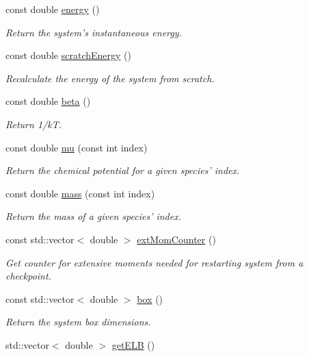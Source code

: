\begin{DoxyCompactItemize}
const double \hyperlink{classsim_system_a37b3d15faf56bf31349f5c2aaf02f858}{energy} ()
\begin{DoxyCompactList}\small\item\em Return the system's instantaneous energy. \end{DoxyCompactList}\item 
const double \hyperlink{classsim_system_a51539ed4c3bb4905b32ce428c1c537fe}{scratch\-Energy} ()
\begin{DoxyCompactList}\small\item\em Recalculate the energy of the system from scratch. \end{DoxyCompactList}\item 
const double \hyperlink{classsim_system_a3eeec9678902f8d7fce4dad6064aaf4c}{beta} ()
\begin{DoxyCompactList}\small\item\em Return 1/k\-T. \end{DoxyCompactList}\item 
const double \hyperlink{classsim_system_af1e3f5320aff976a448647244d5950d1}{mu} (const int index)
\begin{DoxyCompactList}\small\item\em Return the chemical potential for a given species' index. \end{DoxyCompactList}\item 
const double \hyperlink{classsim_system_a7c75052458072e1267bc20594b58d8cd}{mass} (const int index)
\begin{DoxyCompactList}\small\item\em Return the mass of a given species' index. \end{DoxyCompactList}\item 
const std\-::vector$<$ double $>$ \hyperlink{classsim_system_a1744c4c22603662081d75985bc30b754}{ext\-Mom\-Counter} ()
\begin{DoxyCompactList}\small\item\em Get counter for extensive moments needed for restarting system from a checkpoint. \end{DoxyCompactList}\item 
const std\-::vector$<$ double $>$ \hyperlink{classsim_system_a8bff9dfb95b1b09a0fab2c1c485ade07}{box} ()
\begin{DoxyCompactList}\small\item\em Return the system box dimensions. \end{DoxyCompactList}\item 
std\-::vector$<$ double $>$ \hyperlink{classsim_system_a610cbb1c6059151e420dbd42dd9da714}{get\-E\-L\-B} ()

\end{DoxyCompactItemize}
